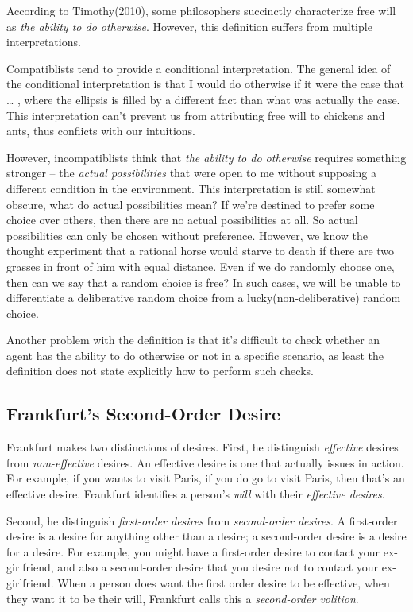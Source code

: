 According to Timothy(2010), some philosophers succinctly characterize free will as \emph{the ability to do otherwise}. However, this definition suffers from multiple interpretations.

Compatiblists tend to provide a conditional interpretation. The general idea of the conditional interpretation is that I would do otherwise if it were the case that … , where the ellipsis is filled by a different fact than what was actually the case. This interpretation can’t prevent us from attributing free will to chickens and ants, thus conflicts with our intuitions.


However, incompatiblists think that \emph{the ability to do otherwise} requires something stronger -- the \emph{actual possibilities} that were open to me without supposing a different condition in the environment. This interpretation is still somewhat obscure, what do actual possibilities mean? If we’re destined to prefer some choice over others, then there are no actual possibilities at all. So actual possibilities can only be chosen without preference. However, we know the thought experiment that a rational horse would starve to death if there are two grasses in front of him with equal distance. Even if we do randomly choose one, then can we say that a random choice is free? In such cases, we will be unable to differentiate a deliberative random choice from a lucky(non-deliberative) random choice.

Another problem with the definition is that it’s difficult to check whether an agent has the ability to do otherwise or not in a specific scenario, as least the definition does not state explicitly how to perform such checks.

\subsection{Frankfurt’s Second-Order Desire}

Frankfurt makes two distinctions of desires. First, he distinguish \emph{effective} desires from \emph{non-effective} desires. An effective desire is one that actually issues in action. For example, if you wants to visit Paris, if you do go to visit Paris, then that’s an effective desire. Frankfurt identifies a person’s \emph{will} with their \emph{effective desires}.

Second, he distinguish \emph{first-order desires} from \emph{second-order desires}. A first-order desire is a desire for anything other than a desire; a second-order desire is a desire for a desire. For example, you might have a first-order desire to contact your ex-girlfriend, and also a second-order desire that you desire not to contact your ex-girlfriend. When a person does want the first order desire to be effective, when they want it to be their will, Frankfurt calls this a \emph{second-order volition}.

